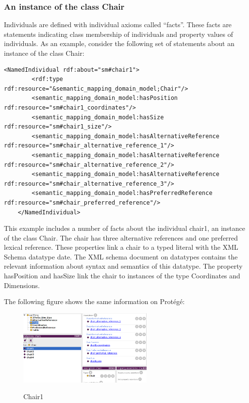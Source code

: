 \subsubsection*{An instance of the class Chair}
Individuals are defined with individual axioms called ``facts''. These facts are statements indicating class membership of individuals and property values of individuals. As an example, consider the following set of statements about an instance of the class Chair:

\begin{lstlisting}    
<NamedIndividual rdf:about="sm#chair1">
        <rdf:type rdf:resource="&semantic_mapping_domain_model;Chair"/>
        <semantic_mapping_domain_model:hasPosition rdf:resource="sm#chair1_coordinates"/>
        <semantic_mapping_domain_model:hasSize rdf:resource="sm#chair1_size"/>
        <semantic_mapping_domain_model:hasAlternativeReference rdf:resource="sm#chair_alternative_reference_1"/>
        <semantic_mapping_domain_model:hasAlternativeReference   rdf:resource="sm#chair_alternative_reference_2"/>
        <semantic_mapping_domain_model:hasAlternativeReference  rdf:resource="sm#chair_alternative_reference_3"/>
        <semantic_mapping_domain_model:hasPreferredReference rdf:resource="sm#chair_preferred_reference"/>
    </NamedIndividual>
\end{lstlisting}

This example includes a number of facts about the individual chair1, an instance of the class Chair. The chair has three alternative references and one preferred lexical reference. These properties link a chair to a typed literal with the XML Schema datatype date. The XML schema document on datatypes contains the relevant information about syntax and semantics of this datatype. The property hasPosition and hasSize link the chair to instances of the type Coordinates and Dimensions.

The following figure shows the same information on Prot\'eg\'e:

\begin{figure}[H]
\centering
\includegraphics[width=0.6\textwidth]{imgs/chair1.png}
\label{fig:datatypes}
\caption{Chair1}
\end{figure}

